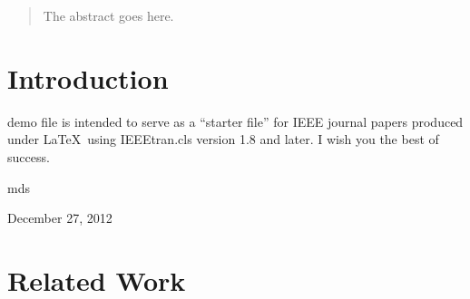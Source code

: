 \documentclass[journal]{IEEEtran}
\begin{document}




\maketitle

\begin{abstract}
The abstract goes here.
\end{abstract}

%
\IEEEpeerreviewmaketitle



\section{Introduction}
% 
% 
% 
% 
 demo file is intended to serve as a ``starter file''
for IEEE journal papers produced under \LaTeX\ using
IEEEtran.cls version 1.8 and later.
I wish you the best of success.

\hfill mds
 
\hfill December 27, 2012

\section{Related Work}
\end{document}
